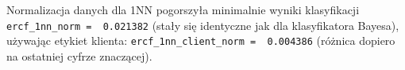 \documentclass[11pt]{article}
\begin{document}
Normalizacja danych dla 1NN pogorszyła minimalnie wyniki klasyfikacji
\texttt{ercf\_1nn\_norm\ =\ \ 0.021382} (stały się identyczne jak dla
klasyfikatora Bayesa), używając etykiet klienta:
\texttt{ercf\_1nn\_client\_norm\ =\ \ 0.004386} (różnica dopiero na
ostatniej cyfrze znaczącej).


    
    
    
    
\end{document}

